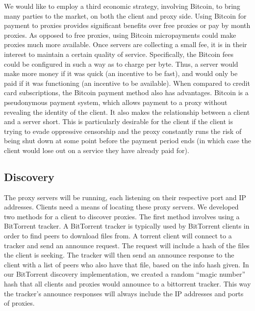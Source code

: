 We would like to employ a third economic strategy, involving Bitcoin, to bring many parties to the market, on both the client and proxy side. Using Bitcoin for payment to proxies provides significant benefits over free proxies or pay by month proxies. As opposed to free proxies, using Bitcoin micropayments could make proxies much more available. Once servers are collecting a small fee, it is in their interest to maintain a certain quality of service. Specifically, the Bitcoin fees could be configured in such a way as to charge per byte. Thus, a server would make more money if it was quick (an incentive to be fast), and would only be paid if it was functioning (an incentive to be available). When compared to credit card subscriptions, the Bitcoin payment method also has advantages. Bitcoin is a pseudonymous payment system, which allows payment to a proxy without revealing the identity of the client. It also makes the relationship between a client and a server short. This is particularly desirable for the client if the client is trying to evade oppressive censorship and the proxy constantly runs the risk of being shut down at some point before the payment period ends (in which case the client would lose out on a service they have already paid for).

\subsection{Discovery}
\label{sec:discovery}

The proxy servers will be running, each listening on their respective port and IP addresses. Clients need a means of locating these proxy servers. We developed two methods for a client to discover proxies.
The first method involves using a BitTorrent tracker. A BitTorrent tracker is typically used by BitTorrent clients in order to find peers to download files from. A torrent client will connect to a tracker and send an announce request. The request will include a hash of the files the client is seeking. The tracker will then send an announce response to the client with a list of peers who also have that file, based on the info hash given. In our BitTorrent discovery implementation, we created a random ``magic number'' hash that all clients and proxies would announce to a bittorrent tracker. This way the tracker's announce responses will always include the IP addresses and ports of proxies.


